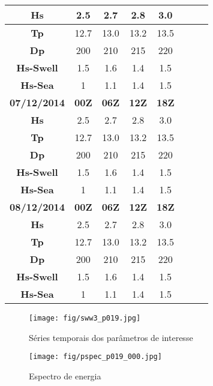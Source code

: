\documentclass{article}
\begin{document}
\begin{table}[H]
\begin{tabular}{| c | c | c | c | c | c | c | c |}
    \textbf{Hs} & 2.5 & 2.7 & 2.8 & 3.0 \\ \hline
    \textbf{Tp} & 12.7 & 13.0 & 13.2 & 13.5 \\ \hline
    \textbf{Dp} & 200 & 210 & 215 &  220 \\ \hline
    \textbf{Hs-Swell} & 1.5 & 1.6 & 1.4 & 1.5 \\ \hline
    \textbf{Hs-Sea} & 1 & 1.1 & 1.4 & 1.5 \\ \hline
    \hline \hline
    \rowcolor{Gray}
    \textbf{07/12/2014} & \textbf{00Z} & \textbf{06Z} & \textbf{12Z} & \textbf{18Z} \\ \hline \hline
    \textbf{Hs} & 2.5 & 2.7 & 2.8 & 3.0 \\ \hline
    \textbf{Tp} & 12.7 & 13.0 & 13.2 & 13.5 \\ \hline
    \textbf{Dp} & 200 & 210 & 215 &  220 \\ \hline
    \textbf{Hs-Swell} & 1.5 & 1.6 & 1.4 & 1.5 \\ \hline
    \textbf{Hs-Sea} & 1 & 1.1 & 1.4 & 1.5 \\ \hline
    \hline \hline
    \rowcolor{Gray}
    \textbf{08/12/2014} & \textbf{00Z} & \textbf{06Z} & \textbf{12Z} & \textbf{18Z} \\ \hline \hline
    \textbf{Hs} & 2.5 & 2.7 & 2.8 & 3.0 \\ \hline
    \textbf{Tp} & 12.7 & 13.0 & 13.2 & 13.5 \\ \hline
    \textbf{Dp} & 200 & 210 & 215 &  220 \\ \hline
    \textbf{Hs-Swell} & 1.5 & 1.6 & 1.4 & 1.5 \\ \hline
    \textbf{Hs-Sea} & 1 & 1.1 & 1.4 & 1.5 \\ \hline
    \end{tabular}
\end{table}

\begin{figure}[t]
\begin{center}
\texttt{[image: fig/sww3\_p019.jpg]} %
\caption{Séries temporais dos parâmetros de interesse}
\end{center}
\end{figure}

\begin{figure}[H]
\begin{center}
\texttt{[image: fig/pspec\_p019\_000.jpg]} %
\caption{Espectro de energia}
\end{center}
\end{figure}
\end{document}
